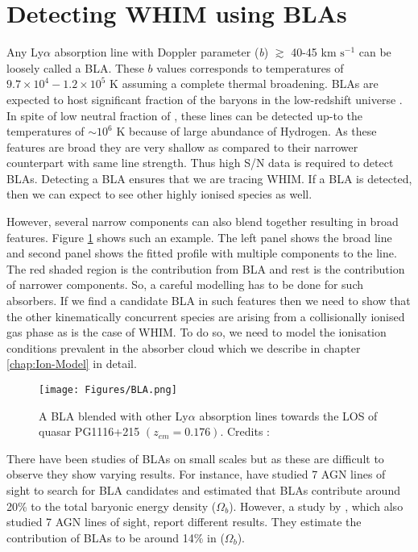 \section{Detecting WHIM using BLAs} \label{sec:WHIM-BLA}

Any Ly$\alpha$ absorption line with Doppler parameter (\emph{b}) $\gtrsim$ 40-45 km $\text{s}^{-1}$ can be loosely called a BLA. These $b$ values corresponds to temperatures of $9.7\times 10^4 - 1.2 \times 10^5$ K assuming a complete thermal broadening. BLAs are expected to host significant fraction of the baryons in the low-redshift universe \citep{Richter-2004,Richter-2006,Lehner-2006,Lehner-2007}. In spite of low neutral fraction of , these lines can be detected up-to the temperatures of $\sim10^6$ K because of large abundance of Hydrogen. As these features are broad they are very shallow as compared to their narrower counterpart with same line strength. Thus high S/N data is required to detect BLAs. Detecting a BLA ensures that we are tracing WHIM. If a BLA is detected, then we can expect to see other highly ionised species as well. 

However, several narrow components can also blend together resulting in broad features. Figure \ref{fig:BLA} shows such an example. The left panel shows the broad line and second panel shows the fitted profile with multiple components to the line. The red shaded region is the contribution from BLA and rest is the contribution of narrower components. So, a careful modelling has to be done for such absorbers. If we find a candidate BLA in such features then we need to show that the other kinematically concurrent species are arising from a collisionally ionised gas phase as is the case of WHIM. To do so, we need to model the ionisation conditions prevalent in the absorber cloud which we describe in chapter \ref{chap:Ion-Model} in detail.

\begin{figure}[!h]
    \centering
    \texttt{[image: Figures/BLA.png]}
    \caption{A BLA blended with other Ly$\alpha$ absorption lines towards the LOS of quasar PG1116+215 $(z_{em} = 0.176)$. Credits : \citet{Richter_2020}}
    \label{fig:BLA}
\end{figure}

There have been studies of BLAs on small scales but as these are difficult to observe they show varying results. For instance, \citet{Lehner-2007} have studied 7 AGN lines of sight to search for BLA candidates and estimated that BLAs contribute around 20\% to the total baryonic energy density ($\Omega_b$). However, a study by \citet{Danforth_2010}, which also studied 7 AGN lines of sight, report different results. They estimate the contribution of BLAs to be around 14\% in ($\Omega_b$).

